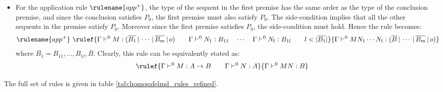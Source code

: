 \begin{itemize}
\item For the application rule $\rulename{app^+}$, the type of the sequent in the first premise has the same order
as the type of the conclusion premise, and since the conclusion
satisfies $P_0$, the first premise must also satisfy $P_0$. The
side-condition implies that all the other sequents in the premise
satisfy $P_0$. Moreover since the first premise satisfies $P_0$, the
side-condition must hold. Hence the rule becomes:
$$ \rulename{app^+} \
    \rulef{
        \Gamma \vdash^0 M : (\overline{B_1} \, | \, \cdots \, | \, \overline{B_m} \, | \, o) \qquad
        \Gamma \vdash^0 N_1 : B_{11} \quad \cdots \quad \Gamma \vdash^0 N_{l} : B_{1l} \qquad l < |\overline{B_1}|
    }
    {
        \Gamma \vdash^0 M N_1 \cdots N_{l} : (\overline{B} \, | \, \cdots \, | \, \overline{B_m} \, | \, o)
    }
$$
where $\overline{B_1} = B_{11}, \ldots, B_{1l},\overline{B}$.
Clearly, this rule can be equivalently stated as:
$$ \rulef{\Gamma \vdash^0 M : A\rightarrow B
                                        \qquad \Gamma \vdash^{0} N : A
                                   }
                                   {\Gamma  \vdash^{0} M N : B}$$
\end{itemize}

The full set of rules is given in table \ref{tab:homosafelmd_rules_refined}.

